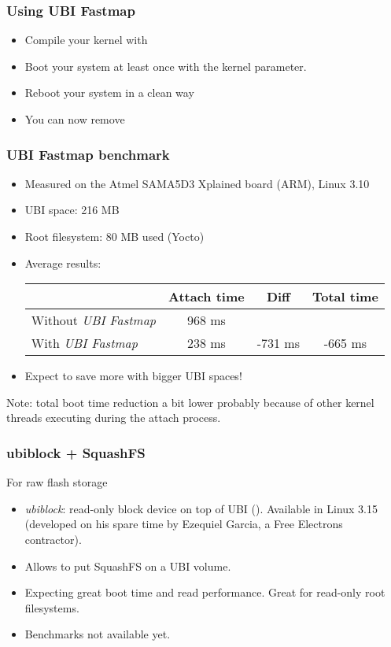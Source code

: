 \begin{frame}
\frametitle{Using UBI Fastmap}
\begin{itemize}
\item Compile your kernel with 
\item Boot your system at least once with the
       kernel parameter.
\item Reboot your system in a clean way
\item You can now remove 
\end{itemize}
\end{frame}

\begin{frame}
\frametitle{UBI Fastmap benchmark}
\begin{itemize}
\item Measured on the Atmel SAMA5D3 Xplained board (ARM), Linux 3.10
\item UBI space: 216 MB
\item Root filesystem: 80 MB used (Yocto)
\item Average results:
    \newline \newline
    \begin{tabular}{| l || c | c | c |}
    \hline
    & Attach time & Diff & Total time\\
    \hline
    Without {\em UBI Fastmap} & 968 ms & & \\
    With {\em UBI Fastmap} & 238 ms & -731 ms & -665 ms \\
    \hline
    \end{tabular}
    \newline
\item Expect to save more with bigger UBI spaces!
\end{itemize}
Note: total boot time reduction a bit lower probably
because of other kernel threads executing during the
attach process.
\end{frame}

\begin{frame}
\frametitle{ubiblock + SquashFS}
For raw flash storage
\begin{itemize}
\item {\em ubiblock}: read-only block device on top of UBI
      (). Available in Linux 3.15
      (developed on his spare time by Ezequiel Garcia,
      a Free Electrons contractor).
\item Allows to put SquashFS on a UBI volume.
\item Expecting great boot time and read performance. Great
      for read-only root filesystems.
\item Benchmarks not available yet.
\end{itemize}
\end{frame}

